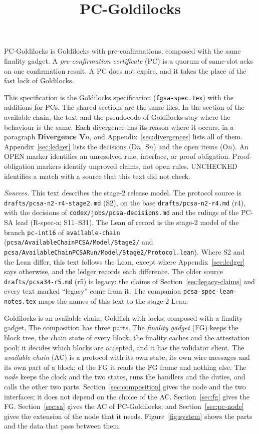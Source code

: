 \documentclass{article}
\title{PC-Goldilocks}
\author{}
\date{}
\newcommand{\nm}[1]{\nolinkurl{#1}}
\begin{document}
\maketitle

PC-Goldilocks is Goldilocks with pre-confirmations, composed with the
same finality gadget.  A \emph{pre-confirmation certificate} (PC) is a
quorum of same-slot acks on one confirmation result.  A PC does not
expire, and it takes the place of the fast lock of Goldilocks.

This specification is the Goldilocks specification
(\nm{fgsa-spec.tex}) with the additions for PCs.  The shared sections are
the same files.  In the section of the available chain, the text and the
pseudocode of Goldilocks stay where the behaviour is the same.  Each
divergence has its reason where it occurs, in a paragraph
\textbf{Divergence V$n$}, and Appendix~\ref{sec:divergences} lists all of
them.  Appendix~\ref{sec:ledger} lists the decisions (D$n$, S$n$) and the
open items (O$n$).  An OPEN marker identifies an unresolved rule,
interface, or proof obligation.  Proof-obligation markers identify
unproved claims, not open rules.  UNCHECKED identifies a match with a
source that this text did not check.

\emph{Sources.}  This text describes the stage-2 release model.  The
protocol source is \nm{drafts/pcsa-n2-r4-stage2.md} (S2), on the base
\nm{drafts/pcsa-n2-r4.md} (r4), with the decisions of
\nm{codex/jobs/pcsa-decisions.md} and the rulings of the PC-SA lead
(R-spec-a; S11--S31).  The Lean of record is the stage-2 model of the
branch \nm{pc-int16} of \nm{available-chain}
(\nm{pcsa/AvailableChainPCSA/Model/Stage2/} and
\nm{pcsa/AvailableChainPCSARun/Model/Stage2/Protocol.lean}).  Where S2 and
the Lean differ, this text follows the Lean, except where
Appendix~\ref{sec:ledger} says otherwise, and the ledger records each
difference.  The older source \nm{drafts/pcsa34-r5.md} (r5) is
legacy: the claims of Section~\ref{sec:legacy-claims} and every text
marked ``legacy'' come from it.  The companion
\nm{pcsa-spec-lean-notes.tex} maps the names of this text to the stage-2
Lean.

Goldilocks is an available chain, Goldfish with locks, composed with a
finality gadget.  The composition has three parts.  The \emph{finality gadget} (FG) keeps the
block tree, the chain state of every block, the finality caches and the
attestation pool; it decides which blocks are accepted, and it has the
validator client.  The \emph{available chain} (AC) is a protocol with its
own state, its own wire messages and its own part of a block; of the FG it
reads the FG frame and nothing else.  The \emph{node} keeps the clock and
the two states, runs the handlers and the duties, and calls the other two
parts.  Section~\ref{sec:composition} gives the node and the two
interfaces; it does not depend on the choice of the AC.
Section~\ref{sec:fg} gives the FG.  Section~\ref{sec:sa} gives the AC of
PC-Goldilocks, and Section~\ref{sec:pc-node} gives the extension of the
node that it needs.  Figure~\ref{fig:system} shows the parts and the data
that pass between them.
\end{document}
